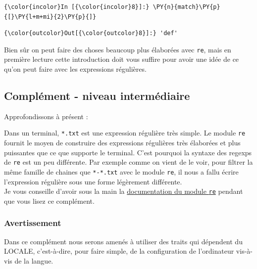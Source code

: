     \begin{Verbatim}[commandchars=\\\{\}]
{\color{incolor}In [{\color{incolor}8}]:} \PY{n}{match}\PY{p}{[}\PY{l+m+mi}{2}\PY{p}{]}
\end{Verbatim}


\begin{Verbatim}[commandchars=\\\{\}]
{\color{outcolor}Out[{\color{outcolor}8}]:} 'def'
\end{Verbatim}
            
    Bien sûr on peut faire des choses beaucoup plus élaborées avec
\texttt{re}, mais en première lecture cette introduction doit vous
suffire pour avoir une idée de ce qu'on peut faire avec les expressions
régulières.

    \hypertarget{compluxe9ment---niveau-intermuxe9diaire}{%
\subsection{Complément - niveau
intermédiaire}\label{compluxe9ment---niveau-intermuxe9diaire}}

    Approfondissons à présent :

    Dans un terminal, \texttt{*.txt} est une expression régulière très
simple. Le module \texttt{re} fournit le moyen de construire des
expressions régulières très élaborées et plus puissantes que ce que
supporte le terminal. C'est pourquoi la syntaxe des regexps de
\texttt{re} est un peu différente. Par exemple comme on vient de le
voir, pour filtrer la même famille de chaines que \texttt{*-*.txt} avec
le module \texttt{re}, il nous a fallu écrire l'expression régulière
sous une forme légèrement différente.\\

    Je vous conseille d'avoir sous la main la
\href{https://docs.python.org/3/library/re.html}{documentation du module
\texttt{re}} pendant que vous lisez ce complément.

    \hypertarget{avertissement}{%
\subsubsection{Avertissement}\label{avertissement}}

    Dans ce complément nous serons amenés à utiliser des traits qui
dépendent du LOCALE, c'est-à-dire, pour faire simple, de la
configuration de l'ordinateur vis-à-vis de la langue.\\


